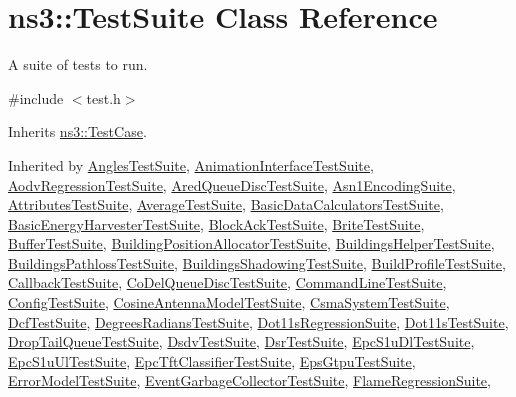 \hypertarget{classns3_1_1TestSuite}{}\section{ns3\+:\+:Test\+Suite Class Reference}
\label{classns3_1_1TestSuite}


A suite of tests to run.  




{\ttfamily \#include $<$test.\+h$>$}



Inherits \hyperlink{classns3_1_1TestCase}{ns3\+::\+Test\+Case}.



Inherited by \hyperlink{classAnglesTestSuite}{Angles\+Test\+Suite}, \hyperlink{classAnimationInterfaceTestSuite}{Animation\+Interface\+Test\+Suite}, \hyperlink{classAodvRegressionTestSuite}{Aodv\+Regression\+Test\+Suite}, \hyperlink{classAredQueueDiscTestSuite}{Ared\+Queue\+Disc\+Test\+Suite}, \hyperlink{classAsn1EncodingSuite}{Asn1\+Encoding\+Suite}, \hyperlink{classAttributesTestSuite}{Attributes\+Test\+Suite}, \hyperlink{classAverageTestSuite}{Average\+Test\+Suite}, \hyperlink{classBasicDataCalculatorsTestSuite}{Basic\+Data\+Calculators\+Test\+Suite}, \hyperlink{classBasicEnergyHarvesterTestSuite}{Basic\+Energy\+Harvester\+Test\+Suite}, \hyperlink{classBlockAckTestSuite}{Block\+Ack\+Test\+Suite}, \hyperlink{classBriteTestSuite}{Brite\+Test\+Suite}, \hyperlink{classBufferTestSuite}{Buffer\+Test\+Suite}, \hyperlink{classBuildingPositionAllocatorTestSuite}{Building\+Position\+Allocator\+Test\+Suite}, \hyperlink{classBuildingsHelperTestSuite}{Buildings\+Helper\+Test\+Suite}, \hyperlink{classBuildingsPathlossTestSuite}{Buildings\+Pathloss\+Test\+Suite}, \hyperlink{classBuildingsShadowingTestSuite}{Buildings\+Shadowing\+Test\+Suite}, \hyperlink{classBuildProfileTestSuite}{Build\+Profile\+Test\+Suite}, \hyperlink{classCallbackTestSuite}{Callback\+Test\+Suite}, \hyperlink{classCoDelQueueDiscTestSuite}{Co\+Del\+Queue\+Disc\+Test\+Suite}, \hyperlink{classCommandLineTestSuite}{Command\+Line\+Test\+Suite}, \hyperlink{classConfigTestSuite}{Config\+Test\+Suite}, \hyperlink{classCosineAntennaModelTestSuite}{Cosine\+Antenna\+Model\+Test\+Suite}, \hyperlink{classCsmaSystemTestSuite}{Csma\+System\+Test\+Suite}, \hyperlink{classDcfTestSuite}{Dcf\+Test\+Suite}, \hyperlink{classDegreesRadiansTestSuite}{Degrees\+Radians\+Test\+Suite}, \hyperlink{classDot11sRegressionSuite}{Dot11s\+Regression\+Suite}, \hyperlink{classDot11sTestSuite}{Dot11s\+Test\+Suite}, \hyperlink{classDropTailQueueTestSuite}{Drop\+Tail\+Queue\+Test\+Suite}, \hyperlink{classDsdvTestSuite}{Dsdv\+Test\+Suite}, \hyperlink{classDsrTestSuite}{Dsr\+Test\+Suite}, \hyperlink{classEpcS1uDlTestSuite}{Epc\+S1u\+Dl\+Test\+Suite}, \hyperlink{classEpcS1uUlTestSuite}{Epc\+S1u\+Ul\+Test\+Suite}, \hyperlink{classEpcTftClassifierTestSuite}{Epc\+Tft\+Classifier\+Test\+Suite}, \hyperlink{classEpsGtpuTestSuite}{Eps\+Gtpu\+Test\+Suite}, \hyperlink{classErrorModelTestSuite}{Error\+Model\+Test\+Suite}, \hyperlink{classEventGarbageCollectorTestSuite}{Event\+Garbage\+Collector\+Test\+Suite}, \hyperlink{classFlameRegressionSuite}{Flame\+Regression\+Suite}, 